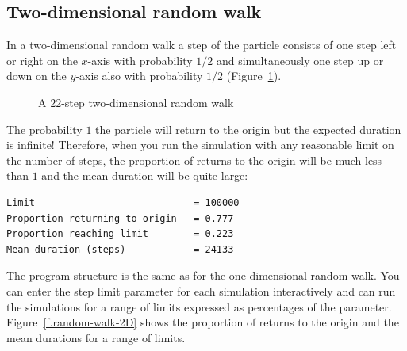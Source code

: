 \subsection{Two-dimensional random walk}

In a two-dimensional random walk \cite{mos,mosteller} a step of the particle consists of one step left or right on the $x$-axis with probability $1/2$ and simultaneously one step up or down on the $y$-axis also with probability $1/2$ (Figure~\ref{f.2d-random-walk}).

\begin{figure}
\begin{center}
\end{center}
\caption{A $22$-step two-dimensional random walk}\label{f.2d-random-walk}
\end{figure}
The probability $1$ the particle will return to the origin but the expected duration is infinite! Therefore, when you run the simulation with any reasonable limit on the number of steps, the proportion of returns to the origin will be much less than $1$ and the mean duration will be quite large:
\begin{verbatim}
Limit                            = 100000
Proportion returning to origin   = 0.777
Proportion reaching limit        = 0.223
Mean duration (steps)            = 24133
\end{verbatim}

The program structure is the same as for the one-dimensional random walk. You can enter the step limit parameter for each simulation interactively and can run the simulations for a range of limits expressed as percentages of the parameter. Figure~\ref{f.random-walk-2D} shows the proportion of returns to the origin and the mean durations for a range of limits.

